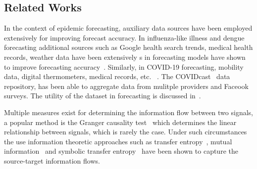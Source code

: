 \documentclass[conference,compsoc]{IEEEtran}
\newcommand{\hub}{\emph{The Hub}}
\begin{document}

\subsection{Related Works}
In the context of epidemic forecasting, auxiliary data sources have been employed extensively for improving forecast accuracy. 
In influenza-like illness and dengue forecasting additional sources such as Google health search trends, medical health records, weather data have been extensively s in forecasting models have shown to improve forecasting accuracy~\cite{yang2015accurate, prashant2019PLOSCompBio,shaman2012forecasting}. Similarly, in COVID-19 forecasting, mobility data, digital thermometers, medical records, etc. ~\cite{kapoor2020examining,wang2020using,fritz2021combining,rodriguez2020deepcovid}. 
The COVIDcast~\cite{reinhart2021open} data repository, has been able to aggregate data from mulitple providers and Faceook surveys. The utility of the dataset in forecasting is discussed in~\cite{mcdonald2021can}.  

Multiple measures exist for determining the information flow between two signals, a popular method is the Granger causality test~\cite{granger1969investigating} which determines the linear relationship between signals, which is rarely the case. Under such circumstances the use information theoretic approaches such as transfer entropy~\cite{schreiber2000measuring}, mutual information~\cite{dionisio2004mutual} and symbolic transfer entropy~\cite{staniek2008symbolic} have been shown to capture the source-target information flows.
\end{document}
